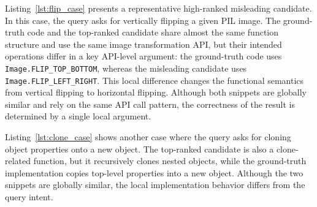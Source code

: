 \documentclass[10pt,conference]{IEEEtran}
\begin{document}
Listing~\ref{lst:flip_case} presents a representative high-ranked misleading candidate. 
In this case, the query asks for vertically flipping a given PIL image. 
The ground-truth code and the top-ranked candidate share almost the same function structure and use the same image transformation API, but their intended operations differ in a key API-level argument: the ground-truth code uses \texttt{Image.FLIP\_TOP\_BOTTOM}, whereas the misleading candidate uses \texttt{Image.FLIP\_LEFT\_RIGHT}. 
This local difference changes the functional semantics from vertical flipping to horizontal flipping. 
Although both snippets are globally similar and rely on the same API call pattern, the correctness of the result is determined by a single local argument.





Listing~\ref{lst:clone_case} shows another case where the query asks for cloning object properties onto a new object. 
The top-ranked candidate is also a clone-related function, but it recursively clones nested objects, while the ground-truth implementation copies top-level properties into a new object. 
Although the two snippets are globally similar, the local implementation behavior differs from the query intent. 
\end{document}
